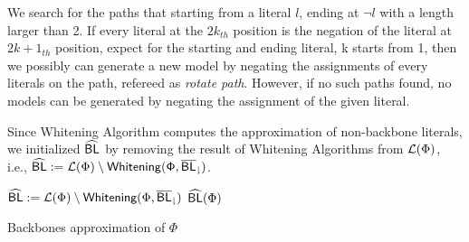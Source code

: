  We search for the paths that starting from a literal $l$, ending at $\neg l$ with a length larger than 2. If every literal at the $2k_{th}$ position is the negation of the literal at $2k+1_{th}$ position, expect for the starting and ending literal, k starts from 1, then we possibly can generate a new model by negating the assignments of every literals on the path, refereed as \emph{rotate path}. However, if no such paths found, no models can be generated by negating the assignment of the given literal.

  Since Whitening Algorithm computes the approximation of non-backbone literals, we initialized ${\sf \widehat{BL}}$ by removing the result of Whitening Algorithms from ${\cal L}(\Phi)$, i.e., ${\sf \widehat{BL}}:={\cal L}(\Phi)\setminus{\sf Whitening(\Phi,{\sf \overline{BL}_\downharpoonright})}$.
   

\begin{algorithm}
\SetAlgoShortEnd
\SetFillComment
{}


${\sf \widehat{BL}}:={\cal L}(\Phi)\setminus{\textsf{Whitening}}(\Phi,{\sf \overline{BL}_\downharpoonright})$\;
\Return ${\sf \widehat{BL}}(\Phi)$\;
\caption{Backbones approximation of $\Phi$}
\label{alg:nBLo}
\end{algorithm}
 